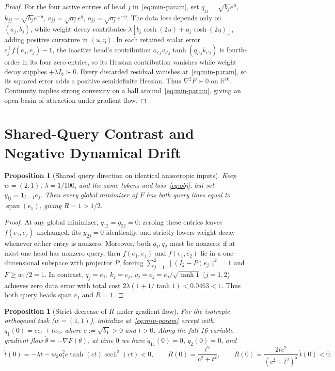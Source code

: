 \documentclass[11pt]{article}
\theoremstyle{plain}
\newtheorem{proposition}[theorem]{Proposition}
\theoremstyle{definition}
\theoremstyle{remark}
\DeclareMathOperator{\sech}{sech}
\begin{document}
\begin{proof}
For the four active entries of head $j$ in~\eqref{eq:min-param}, set $q_{jj} = \sqrt{b_j} e^u$, $k_{jj} = \sqrt{b_j} e^{-u}$, $v_{jj} = \sqrt{a_j} e^\eta$, $o_{jj} = \sqrt{a_j} e^{-\eta}$. The data loss depends only on $(a_j, b_j)$, while weight decay contributes $\lambda[b_j\cosh(2u) + a_j\cosh(2\eta)]$, adding positive curvature in $(u, \eta)$. In each retained scalar error $e_j^\top f(e_j, e_j) - 1$, the inactive head's contribution $o_{i'j} v_{i'j} \tanh(q_{i'j} k_{i'j})$ is fourth-order in its four zero entries, so its Hessian contribution vanishes while weight decay supplies $+\lambda I_8 \succ 0$. Every discarded residual vanishes at~\eqref{eq:min-param}, so its squared error adds a positive semidefinite Hessian. Thus $\nabla^2 F \succ 0$ on $\mathbb{R}^{16}$. Continuity implies strong convexity on a ball around~\eqref{eq:min-param}, giving an open basin of attraction under gradient flow.
\end{proof}

\section{Shared-Query Contrast and Negative Dynamical Drift}

\begin{proposition}[Shared query direction on identical anisotropic inputs]\label{prop:shared}
Keep $w = (2, 1)$, $\lambda = 1/100$, and the same tokens and loss~\eqref{eq:obj}, but set $y_{lj} = \mathbf{1}_{l=1} e_j$. Then every global minimizer of $F$ has both query lines equal to $\operatorname{span}(e_1)$, giving $R = 1 > 1/2$.
\end{proposition}

\begin{proof}
At any global minimizer, $q_{12} = q_{22} = 0$: zeroing these entries leaves $f(e_1, e_j)$ unchanged, fits $y_{2j} = 0$ identically, and strictly lowers weight decay whenever either entry is nonzero. Moreover, both $q_1, q_2$ must be nonzero: if at most one head has nonzero query, then $f(e_1, e_1)$ and $f(e_1, e_2)$ lie in a one-dimensional subspace with projector $P$, forcing $\sum_{j=1}^2 \|(I_2 - P)e_j\|^2 = 1$ and $F \ge w_1/2 = 1$. In contrast, $q_j = e_1$, $k_j = e_j$, $v_j = o_j = e_j/\sqrt{\tanh 1}$ ($j = 1, 2$) achieves zero data error with total cost $2\lambda(1 + 1/\tanh 1) < 0.0463 < 1$. Thus both query heads span $e_1$ and $R = 1$.
\end{proof}

\begin{proposition}[Strict decrease of $R$ under gradient flow]\label{prop:dyn}
For the isotropic orthogonal task ($w = (1, 1)$), initialize at~\eqref{eq:min-param} except with $q_1(0) = c e_1 + t e_2$, where $c := \sqrt{b_1} > 0$ and $t > 0$. Along the full 16-variable gradient flow $\dot{\theta} = -\nabla F(\theta)$, at time $0$ we have $\dot{q}_{11}(0) = 0$, $\dot{q}_2(0) = 0$, and
\[
\dot{t}(0) = -\lambda t - w_2 a_1^2 c \tanh(ct)\sech^2(ct) < 0,
\qquad
R(0) = \frac{t^2}{c^2 + t^2},
\qquad
\dot{R}(0) = \frac{2 t c^2}{(c^2 + t^2)^2}\,\dot{t}(0) < 0.
\]
\end{proposition}
\end{document}
